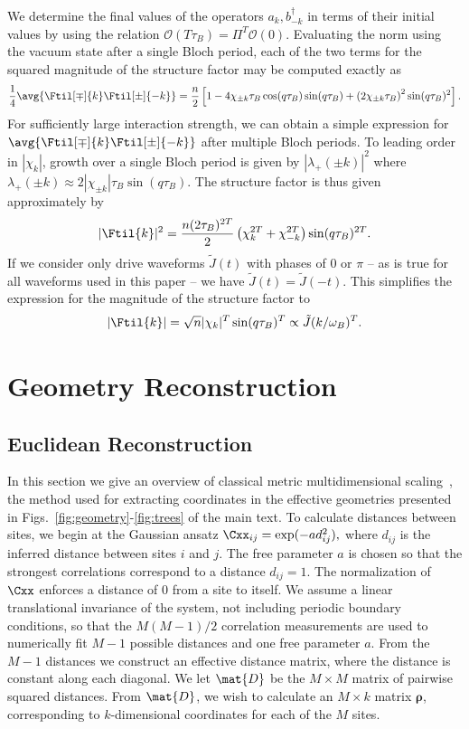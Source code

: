 \begin{bibunit}
 We determine the final values of the operators $a_k,b^\dagger_{-k}$ in terms of their initial values by using the relation $\mathcal{O}(T\tau_B) = \Pi^{T}\mathcal{O}(0)$. 
 Evaluating the norm using the vacuum state after a single Bloch period, each of the two terms for the squared magnitude of the structure factor may be computed exactly as
 \begin{equation}
    \frac{1}{4}\avg{\Ftil[\mp]{ k}\Ftil[\pm]{-k}} = \frac{n}{2} \left[1-4\chi_{\pm k}\tau_B \cos(q\tau_B)\sin(q\tau_B) + \left(2\chi_{\pm k}\tau_B\right)^2\sin(q\tau_B)^2\right].
\end{equation}
For sufficiently large interaction strength, we can obtain a simple expression for $\avg{\Ftil[\mp]{ k}\Ftil[\pm]{-k}}$ after multiple Bloch periods. To leading order in $|\chi_k|$, growth over a single Bloch period is given by $|\lambda_{+}(\pm k)|^2$ where $\lambda_{+} (\pm k) \approx 2|\chi_{\pm k}|\tau_B\sin(q\tau_B)$. The structure factor is thus given approximately by
\begin{equation}
|\Ftil{k}|^2 = \frac{n(2\tau_B)^{2T}}{2} \left(\chi_k^{2T}+\chi_{-k}^{2T}\right)\sin(q\tau_B)^{2T}.
\end{equation}
If we consider only drive waveforms $\tilde{J}(t)$ with phases of $0$ or $\pi$ -- as is true for all waveforms used in this paper -- we have $\tilde{J}(t) = \tilde{J}(-t)$. This simplifies the expression for the magnitude of the structure factor to
\begin{equation}
    |\Ftil{k}| = \sqrt{n} |\chi_{k}|^{T}\sin(q\tau_B)^{T}\propto \tilde{J}(k/\omega_B)^T.
\end{equation}

\section{Geometry Reconstruction}
\subsection{Euclidean Reconstruction}
In this section we give an overview of classical metric multidimensional scaling~\cite{torgerson1952multidimensional}, the method used for extracting coordinates in the effective geometries presented in Figs.~\ref{fig:geometry}-\ref{fig:trees} of the main text. To calculate distances between sites, we begin at the Gaussian ansatz $\Cxx_{ij} = \exp(-ad_{ij}^2),$ where $d_{ij}$ is the inferred distance between sites $i$ and $j$.  
The free parameter $a$ is chosen so that the strongest correlations correspond to a distance $d_{ij}=1$.  The normalization of $\Cxx$ enforces a distance of 0 from a site to itself.  
We assume a linear translational invariance of the system, not including periodic boundary conditions, so that the $M(M - 1)/2$ correlation measurements are used to numerically fit $M - 1$ possible distances and one free parameter $a$.  
From the $M - 1$ distances we construct an effective distance matrix, where the distance is constant along each diagonal.  We let $\mat{D}$ be the $M\times M$ matrix of pairwise squared distances. From $\mat{D}$, we wish to calculate an $M\times k$ matrix $\boldsymbol{\rho}$, corresponding to $k$-dimensional coordinates for each of the $M$ sites.


\end{bibunit}
